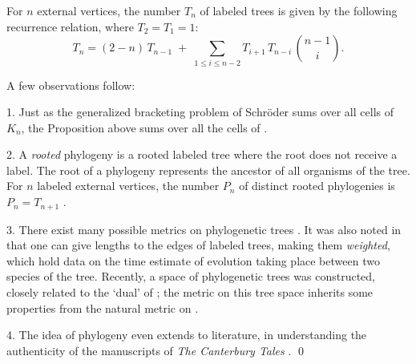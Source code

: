 \documentclass[10pt]{amsart}
\begin{document}
\begin{prop} \textup{\cite[\S2]{fr}}
For $n$ external vertices, the number $T_n$ of labeled trees is given by the following recurrence relation, where $T_2=T_1=1$:
$$ T_n = (2-n) \, T_{n-1} \;+\; \sum_{1 \leq i \leq n-2} T_{i+1} \, T_{n-i} \, \binom{n-1}{i}.$$
\end{prop}

\begin{rem} A few observations follow:

1. Just as the generalized bracketing problem of Schr\"oder sums over all cells of $K_n$, the Proposition above sums over all the cells of .

2. A {\em rooted} phylogeny is a rooted labeled tree where the root does not receive a label. The root of a phylogeny represents the ancestor of all organisms of the tree. For $n$ labeled external vertices, the number $P_n$ of distinct rooted phylogenies is $P_n = T_{n+1}$ \cite[\S2]{fr}.

3. There exist many possible metrics on phylogenetic trees \cite{fr1}.  It was also noted in \cite{ph} that one can give lengths to the edges of labeled trees, making them {\em weighted}, which hold data on the time estimate of evolution taking place between two species of the tree.  Recently, a space of phylogenetic trees was constructed, closely related to the `dual' of  \cite{bhv}; the metric on this tree space inherits some properties from the natural metric on  \cite[\S2.2]{dev}.

4. The idea of phylogeny even extends to literature, in understanding the authenticity of the manuscripts of {\em The Canterbury Tales} \cite{ct}.
\qed
\end{rem}

\end{document}
